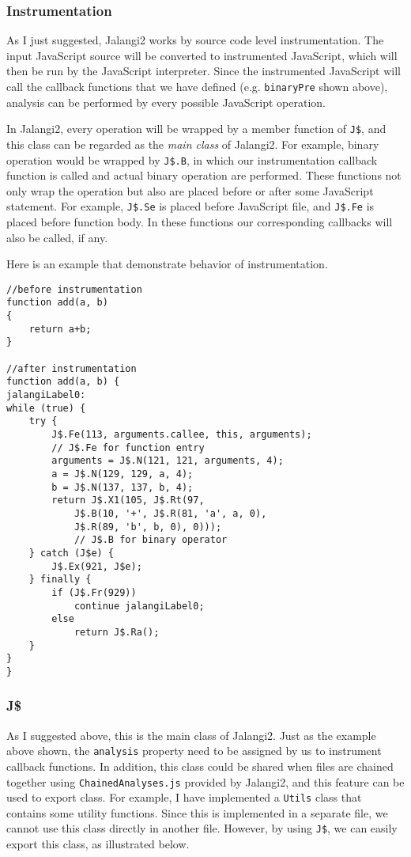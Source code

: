 \subsubsection{Instrumentation}

As I just suggested, Jalangi2 works by source code level instrumentation. The input JavaScript source will be converted to instrumented JavaScript, which will then be run by the JavaScript interpreter. Since the instrumented JavaScript will call the callback functions that we have defined (e.g. \texttt{binaryPre} shown above), analysis can be performed by every possible JavaScript operation.

In Jalangi2, every operation will be wrapped by a member function of \texttt{J\$}, and this class can be regarded as the \textit{main class} of Jalangi2. For example, binary operation would be wrapped by \texttt{J\$.B}, in which our instrumentation callback function is called and actual binary operation are performed. These functions not only wrap the operation but also are placed before or after some JavaScript statement. For example, \texttt{J\$.Se} is placed before JavaScript file, and \texttt{J\$.Fe} is placed before function body. In these functions our corresponding callbacks will also be called, if any. 

Here is an example that demonstrate behavior of instrumentation.

\begin{verbatim}
//before instrumentation
function add(a, b)
{
    return a+b;
}

//after instrumentation
function add(a, b) {
jalangiLabel0:
while (true) {
    try {
        J$.Fe(113, arguments.callee, this, arguments);
        // J$.Fe for function entry
        arguments = J$.N(121, 121, arguments, 4);
        a = J$.N(129, 129, a, 4);
        b = J$.N(137, 137, b, 4);
        return J$.X1(105, J$.Rt(97,
            J$.B(10, '+', J$.R(81, 'a', a, 0),
            J$.R(89, 'b', b, 0), 0)));
            // J$.B for binary operator
    } catch (J$e) {
        J$.Ex(921, J$e);
    } finally {
        if (J$.Fr(929))
            continue jalangiLabel0;
        else
            return J$.Ra();
    }
}
}
\end{verbatim}


\subsubsection{J\$}

As I suggested above, this is the main class of Jalangi2. Just as the example above shown, the \texttt{analysis} property need to be assigned by us to instrument callback functions. In addition, this class could be shared when files are chained together using \texttt{ChainedAnalyses.js} provided by Jalangi2, and this feature can be used to export class. For example, I have implemented a \texttt{Utils} class that contains some utility functions. Since this is implemented in a separate file, we cannot use this class directly in another file. However, by using \texttt{J\$}, we can easily export this class, as illustrated below.

